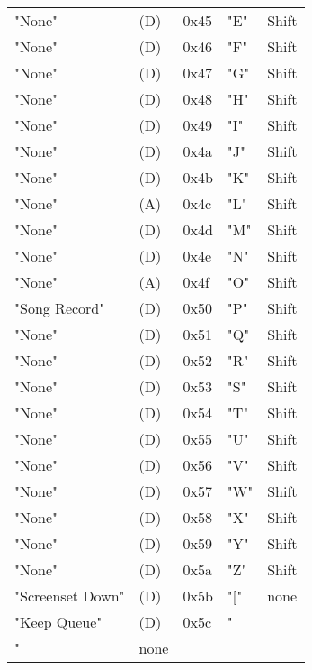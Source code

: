 \begin{table}[htb]
\begin{tabular}{l l l l l}
        "None"               & (D)  &  0x45   & "E"          & Shift \\
        "None"               & (D)  &  0x46   & "F"          & Shift \\
        "None"               & (D)  &  0x47   & "G"          & Shift \\
        "None"               & (D)  &  0x48   & "H"          & Shift \\
        "None"               & (D)  &  0x49   & "I"          & Shift \\
        "None"               & (D)  &  0x4a   & "J"          & Shift \\
        "None"               & (D)  &  0x4b   & "K"          & Shift \\
        "None"               & (A)  &  0x4c   & "L"          & Shift \\
        "None"               & (D)  &  0x4d   & "M"          & Shift \\
        "None"               & (D)  &  0x4e   & "N"          & Shift \\
        "None"               & (A)  &  0x4f   & "O"          & Shift \\
        "Song Record"        & (D)  &  0x50   & "P"          & Shift \\
        "None"               & (D)  &  0x51   & "Q"          & Shift \\
        "None"               & (D)  &  0x52   & "R"          & Shift \\
        "None"               & (D)  &  0x53   & "S"          & Shift \\
        "None"               & (D)  &  0x54   & "T"          & Shift \\
        "None"               & (D)  &  0x55   & "U"          & Shift \\
        "None"               & (D)  &  0x56   & "V"          & Shift \\
        "None"               & (D)  &  0x57   & "W"          & Shift \\
        "None"               & (D)  &  0x58   & "X"          & Shift \\
        "None"               & (D)  &  0x59   & "Y"          & Shift \\
        "None"               & (D)  &  0x5a   & "Z"          & Shift \\
        "Screenset Down"     & (D)  &  0x5b   & "["          & none \\
        "Keep Queue"         & (D)  &  0x5c   & "\\"         & none \\

\end{tabular}
\end{table}
